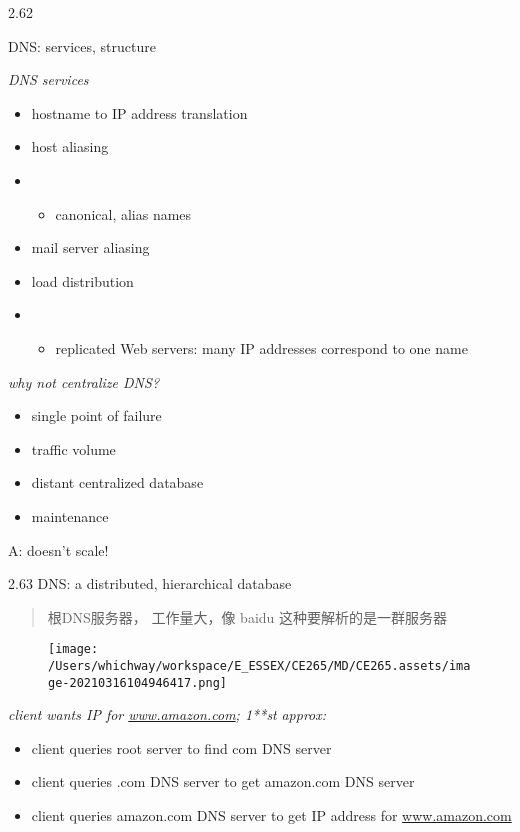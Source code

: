 \documentclass[
]{article}
\begin{document}
2.62

DNS: services, structure

\emph{DNS services}

\begin{itemize}
\item
  hostname to IP address translation
\item
  host aliasing
\item
  \begin{itemize}
  \item
    canonical, alias names
  \end{itemize}
\item
  mail server aliasing
\item
  load distribution
\item
  \begin{itemize}
  \item
    replicated Web servers: many IP addresses correspond to one name
  \end{itemize}
\end{itemize}

\emph{why not centralize DNS?}

\begin{itemize}
\item
  single point of failure
\item
  traffic volume
\item
  distant centralized database
\item
  maintenance
\end{itemize}

A: doesn't scale!

2.63 DNS: a distributed, hierarchical database

\begin{quote}
根DNS服务器， 工作量大，像 baidu 这种要解析的是一群服务器
\end{quote}

\begin{figure}
\centering
\texttt{[image: /Users/whichway/workspace/E\_ESSEX/CE265/MD/CE265.assets/image-20210316104946417.png]}
\caption{}
\end{figure}

\emph{client wants IP for \url{www.amazon.com}; 1**st} \emph{approx:}

\begin{itemize}
\item
  client queries root server to find com DNS server
\item
  client queries .com DNS server to get amazon.com DNS server
\item
  client queries amazon.com DNS server to get IP address for
  \url{www.amazon.com}
\end{itemize}
\end{document}
